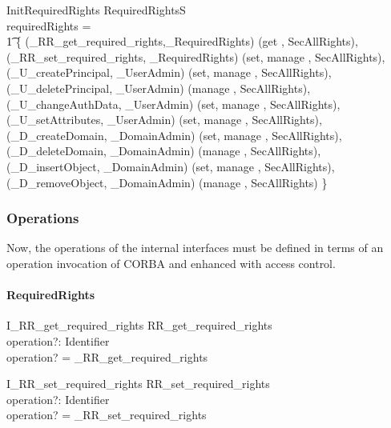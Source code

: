 \begin{schema}{InitRequiredRights}
  RequiredRightsS \\
  \where
  requiredRights =  \\
  \t1 \{ \< (\_RR\_get\_required\_rights,\_RequiredRights) \mapsto (\langle get
  \rangle, SecAllRights), \\ 
  (\_RR\_set\_required\_rights, \_RequiredRights) \mapsto (\langle set, manage
  \rangle, SecAllRights), \\ 
  (\_U\_createPrincipal, \_UserAdmin) \mapsto (\langle set, manage \rangle,
  SecAllRights), \\ 
  (\_U\_deletePrincipal, \_UserAdmin) \mapsto (\langle manage \rangle,
  SecAllRights), \\ 
  (\_U\_changeAuthData, \_UserAdmin) \mapsto (\langle set, manage \rangle,
  SecAllRights), \\ 
  (\_U\_setAttributes, \_UserAdmin) \mapsto (\langle set, manage \rangle,
  SecAllRights), \\ 
  (\_D\_createDomain, \_DomainAdmin) \mapsto (\langle set, manage \rangle,
  SecAllRights), \\ 
  (\_D\_deleteDomain, \_DomainAdmin) \mapsto (\langle manage \rangle,
  SecAllRights), \\ 
  (\_D\_insertObject, \_DomainAdmin) \mapsto (\langle set, manage \rangle,
  SecAllRights), \\ 
  (\_D\_removeObject, \_DomainAdmin) \mapsto (\langle manage \rangle,
  SecAllRights) \} \> 
\end{schema}


\subsubsection{Operations}
Now, the operations of the internal interfaces must be defined in terms of an
operation invocation of CORBA and enhanced with access control.

\paragraph{RequiredRights}
\begin{zedgroup}
\begin{schema}{I\_RR\_get\_required\_rights}
  RR\_get\_required\_rights \\
  operation?: Identifier \\
  \where
  operation? = \_RR\_get\_required\_rights \\
\end{schema}
\begin{schema}{I\_RR\_set\_required\_rights}
  RR\_set\_required\_rights \\
  operation?: Identifier \\
  \where
  operation? = \_RR\_set\_required\_rights \\
\end{schema}
\end{zedgroup}



